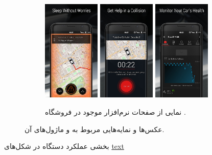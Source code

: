 \documentclass[a4paper,12pt]{report}
\begin{document}
\begin{figure}[!h]
		\begin{subfigure}[t]{0.8\linewidth}
			\centering
			\includegraphics[width=0.3\textwidth]{resources/carlock-app-ui-1.jpeg}
			\includegraphics[width=0.3\textwidth]{resources/carlock-app-ui-2.jpeg}
			\includegraphics[width=0.3\textwidth]{resources/carlock-app-ui-3.jpeg}
			\label{subfig2:fig2:subsec3:sec3:chap1}
			\caption{
				نمایی از صفحات نرم‌افزار
				موجود در فروشگاه
				.
			}
		\end{subfigure}
		\normalsize
		\label{fig2:subsec3:sec3:chap1}
		\caption{
			عکس‌ها و نمایه‌هایی
			مربوط به
			و ماژول‌های آن.
		}
	\end{figure}
		بخشی عملکرد دستگاه در شکل‌های
		\hyperref[subfig2:fig2:subsec3:sec3:chap1]{text}
\end{document}
